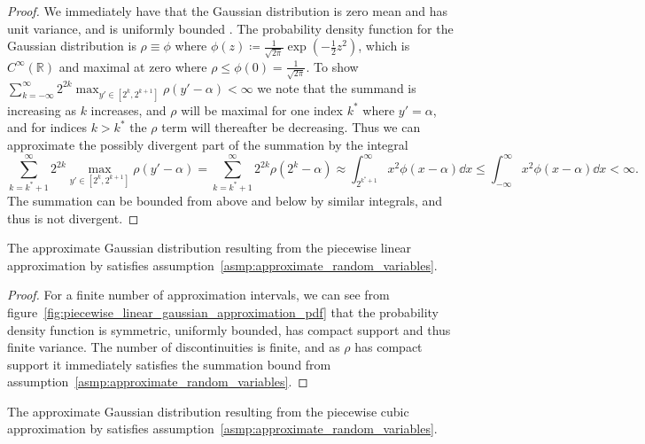 \documentclass[manuscript,review]{acmart}
\begin{document}
\begin{proof}
We immediately have that the Gaussian distribution is zero mean and has unit variance, and is uniformly bounded \citep[appendix~C.2]{blundell2014concepts}. The probability density function for the Gaussian distribution is $ \rho \equiv \phi $ where $ \phi(z) \coloneqq \tfrac{1}{\sqrt{2\pi}} {\exp}(-\tfrac{1}{2}z^2) $, which is $ C^\infty(\mathbb{R}) $ and maximal at zero where $ \rho \leq \phi(0) = \tfrac{1}{\sqrt{2\pi}} $. To show $ \sum_{k=-\infty}^\infty 2^{2k} \max_{y'\in[2^{k}, 2^{k+1}]} \rho(y'-\alpha) < \infty $ we note that the summand is increasing as $ k $ increases, and $ \rho $ will be maximal for one index $ k^* $ where $ y' = \alpha $, and for indices $ k > k^* $ the $ \rho $ term will thereafter be decreasing. Thus we can approximate the possibly divergent part of the summation by the integral 
\begin{equation*}
\sum_{k=k^* + 1}^\infty 2^{2k} \max_{y'\in[2^{k}, 2^{k+1}]} \rho(y'-\alpha) = \sum_{k=k^* + 1}^\infty 2^{2k}  \rho(2^k-\alpha)
\approx \int_{2^{k^* + 1}}^\infty  x^2  \phi(x-\alpha) \dd{x}
\leq \int_{-\infty}^\infty  x^2  \phi(x-\alpha) \dd{x} < \infty.
\end{equation*}
The summation can be bounded from above and below by similar integrals, and thus is not divergent. 
\qedhere
\end{proof}

\begin{lemma}
\label{lemma:approximate_gaussian_distribution_linear}
The approximate Gaussian distribution resulting from the piecewise linear approximation by \citet{giles2020approximating} satisfies assumption~\ref{asmp:approximate_random_variables}.
\end{lemma}

\begin{proof}
For a finite number of approximation intervals, we can see from figure~\ref{fig:piecewise_linear_gaussian_approximation_pdf} that the probability density function is symmetric, uniformly bounded, has compact support and thus finite variance. The number of discontinuities is finite, and as $ \rho $ has compact support it immediately satisfies the summation bound from assumption~\ref{asmp:approximate_random_variables}.
\end{proof}

\begin{lemma}
\label{lemma:approximate_gaussian_distribution_cubic}
The approximate Gaussian distribution resulting from the piecewise cubic approximation by \citet{giles2020approximating} satisfies assumption~\ref{asmp:approximate_random_variables}.
\end{lemma}
\end{document}
